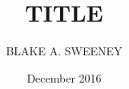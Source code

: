\documentclass{BGSU}
\title{TITLE}
\author{BLAKE A. SWEENEY}
\date{December 2016}
\begin{document}
\frontmatter

\maketitle 

\begin{abstract}

\end{abstract}

\begin{acknowledgments}

\end{acknowledgments}

\tableofcontents

\listoffigures

\listoftables

\mainmatter %




\backmatter


 

\end{document}
